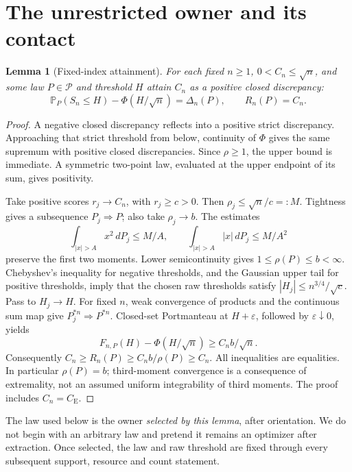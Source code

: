 \documentclass[11pt,a4paper]{article}
\newtheorem{lemma}[theorem]{Lemma}
\newcommand{\Pp}{\mathbb P}
\newcommand{\CE}{C_{\mathrm E}}
\begin{document}
\section{The unrestricted owner and its contact}
\begin{lemma}[Fixed-index attainment]\label{lem:attain}
For each fixed \(n\ge1\), \(0<C_n\le\sqrt n\), and some law \(P\in\mathcal P\)
and threshold \(H\) attain \(C_n\) as a positive closed discrepancy:
\[
 \Pp_P(S_n\le H)-\Phi(H/\sqrt n)=\Delta_n(P),\qquad R_n(P)=C_n.
\]
\end{lemma}
\begin{proof}
A negative closed discrepancy reflects into a positive strict discrepancy.
Approaching that strict threshold from below, continuity of \(\Phi\) gives
the same supremum with positive closed discrepancies. Since \(\rho\ge1\),
the upper bound is immediate. A symmetric two-point law, evaluated at the
upper endpoint of its sum, gives positivity.

Take positive scores \(r_j\to C_n\), with \(r_j\ge c>0\). Then
\(\rho_j\le\sqrt n/c=:M\). Tightness gives a subsequence \(P_j\Rightarrow P\);
also take \(\rho_j\to b\). The estimates
\[
 \int_{|x|>A}x^2\,dP_j\le M/A,\qquad
 \int_{|x|>A}|x|\,dP_j\le M/A^2
\]
preserve the first two moments. Lower semicontinuity gives
\(1\le\rho(P)\le b<\infty\). Chebyshev's inequality for negative thresholds,
and the Gaussian upper tail for positive thresholds, imply that the chosen
raw thresholds satisfy \(|H_j|\le n^{3/4}/\sqrt c\). Pass to \(H_j\to H\).
For fixed \(n\), weak convergence of products and the continuous sum map
give \(P_j^{*n}\Rightarrow P^{*n}\). Closed-set Portmanteau at \(H+\varepsilon\),
followed by \(\varepsilon\downarrow0\), yields
\[
 F_{n,P}(H)-\Phi(H/\sqrt n)\ge C_n b/\sqrt n.
\]
Consequently \(C_n\ge R_n(P)\ge C_n b/\rho(P)\ge C_n\).
All inequalities are equalities. In particular \(\rho(P)=b\); third-moment
convergence is a consequence of extremality, not an assumed uniform
integrability of third moments. The proof includes \(C_n=\CE\).
\end{proof}

The law used below is the owner \emph{selected by this lemma}, after
orientation. We do not begin with an arbitrary law and pretend it remains
an optimizer after extraction. Once selected, the law and raw threshold
are fixed through every subsequent support, resource and count statement.
\end{document}
